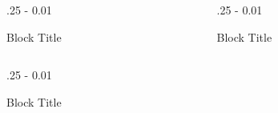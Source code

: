 \documentclass{postertheme}\usepackage[]{graphicx}\usepackage[]{color}
\begin{document}
\begin{frame}
\begin{columns}[onlytextwidth]
\begin{column}{.25 \textwidth - 0.01 \textwidth}
\begin{block}{Block Title}
    \end{block}
  \end{column}

  \begin{column}{.25 \textwidth - 0.01 \textwidth}
    \begin{block}{Block Title}
      \lipsum[4]
    \end{block}
  \end{column}

\end{columns}


\begin{columns}[onlytextwidth]
  
  \begin{column}{.25 \textwidth - 0.01 \textwidth}
    \begin{block}{Block Title}
    \begin{figure}
    

\end{figure}
\end{block}
\end{column}
\end{columns}
\end{frame}
\end{document}
